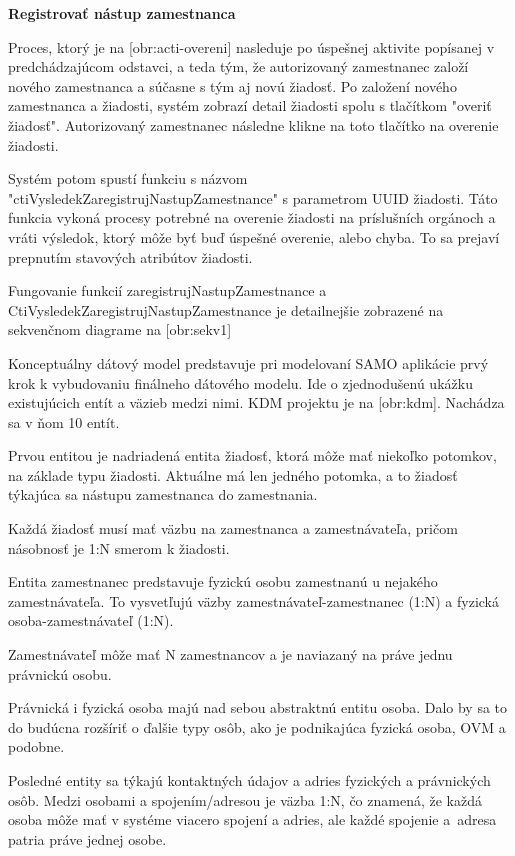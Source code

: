 \blank
\start
\setupindenting[no]
\start\bf  Registrovať nástup zamestnanca\stop
\stop

Proces, ktorý je na [obr:acti-overeni] nasleduje po úspešnej aktivite popísanej v predchádzajúcom odstavci, a teda tým, že autorizovaný zamestnanec založí nového zamestnanca a súčasne s tým aj novú žiadosť. Po založení nového zamestnanca a žiadosti, systém zobrazí detail žiadosti spolu s tlačítkom "overiť žiadosť". Autorizovaný zamestnanec následne klikne na toto tlačítko na overenie žiadosti. 

Systém potom spustí funkciu s názvom "ctiVysledekZaregistrujNastupZamestnance" s parametrom UUID žiadosti. Táto funkcia vykoná procesy potrebné na overenie žiadosti na príslušních orgánoch a vráti výsledok, ktorý môže byť buď úspešné overenie, alebo chyba. To sa prejaví prepnutím stavových atribútov žiadosti. 

Fungovanie funkcií zaregistrujNastupZamestnance a CtiVysledekZaregistrujNastupZamestnance je detailnejšie zobrazené na sekvenčnom diagrame na [obr:sekv1]


Konceptuálny dátový model predstavuje pri modelovaní SAMO aplikácie prvý krok k vybudovaniu finálneho dátového modelu. Ide o zjednodušenú ukážku existujúcich entít a väzieb medzi nimi. KDM projektu je na [obr:kdm]. Nachádza sa v ňom 10 entít.

Prvou entitou je nadriadená entita žiadosť, ktorá môže mať niekoľko potomkov, na základe typu žiadosti. Aktuálne má len jedného potomka, a to žiadosť týkajúca sa nástupu zamestnanca do zamestnania. 

Každá žiadosť musí mať väzbu na zamestnanca a zamestnávateľa, pričom násobnosť je 1:N smerom k žiadosti.

Entita zamestnanec predstavuje fyzickú osobu zamestnanú u nejakého zamestnávateľa. To vysvetľujú väzby zamestnávateľ-zamestnanec (1:N) a fyzická osoba-zamestnávateľ (1:N). 

Zamestnávateľ môže mať N zamestnancov a je naviazaný na práve jednu právnickú osobu. 

Právnická i fyzická osoba majú nad sebou abstraktnú entitu osoba. Dalo by sa to do budúcna rozšíriť o ďalšie typy osôb, ako je podnikajúca fyzická osoba, OVM a podobne. 

Posledné entity sa týkajú kontaktných údajov a adries fyzických a právnických osôb. Medzi osobami a spojením/adresou je väzba 1:N, čo znamená, že každá osoba môže mať v systéme viacero spojení a adries, ale každé spojenie a~adresa patria práve jednej osobe.



